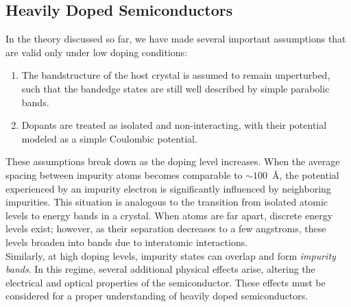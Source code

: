 \subsection{Heavily Doped Semiconductors}
In the theory discussed so far, we have made several important assumptions that are valid only under low doping conditions:
\begin{enumerate}
	\item The bandstructure of the host crystal is assumed to remain unperturbed, such that the bandedge states are still well described by simple parabolic bands.
	\item Dopants are treated as isolated and non-interacting, with their potential modeled as a simple Coulombic potential.
\end{enumerate}
\noindent These assumptions break down as the doping level increases. When the average spacing between impurity atoms becomes comparable to $\sim 100$~\AA, the potential experienced by an impurity electron is significantly influenced by neighboring impurities. This situation is analogous to the transition from isolated atomic levels to energy bands in a crystal. When atoms are far apart, discrete energy levels exist; however, as their separation decreases to a few angstroms, these levels broaden into bands due to interatomic interactions.\\
\noindent Similarly, at high doping levels, impurity states can overlap and form \textit{impurity bands}. In this regime, several additional physical effects arise, altering the electrical and optical properties of the semiconductor. These effects must be considered for a proper understanding of heavily doped semiconductors.
